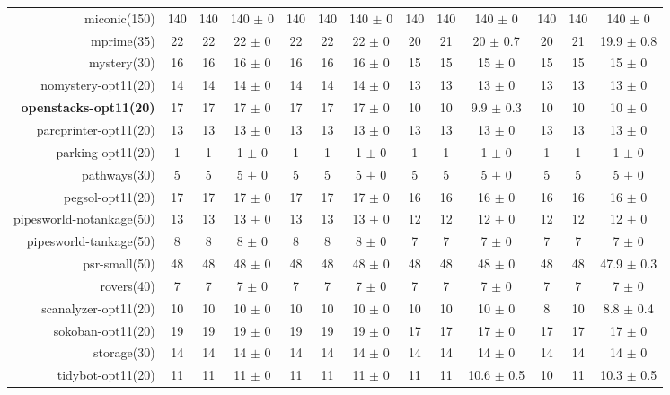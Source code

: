 \begin{center}
\begin{tabular}{|r|*{4}{ccc|}}
miconic(150) & 140 & 140 & 140 \(\pm\) 0 & 140 & 140 & 140 \(\pm\) 0 & 140 & 140 & 140 \(\pm\) 0 & 140 & 140 & 140 \(\pm\) 0\\
mprime(35) & 22 & 22 & 22 \(\pm\) 0 & 22 & 22 & 22 \(\pm\) 0 & 20 & 21 & 20 \(\pm\) 0.7 & 20 & 21 & 19.9 \(\pm\) 0.8\\
mystery(30) & 16 & 16 & 16 \(\pm\) 0 & 16 & 16 & 16 \(\pm\) 0 & 15 & 15 & 15 \(\pm\) 0 & 15 & 15 & 15 \(\pm\) 0\\
nomystery-opt11(20) & 14 & 14 & 14 \(\pm\) 0 & 14 & 14 & 14 \(\pm\) 0 & 13 & 13 & 13 \(\pm\) 0 & 13 & 13 & 13 \(\pm\) 0\\
\textbf{openstacks-opt11(20)} & 17 & 17 & 17 \(\pm\) 0 & 17 & 17 & 17 \(\pm\) 0 & 10 & 10 & 9.9 \(\pm\) 0.3 & 10 & 10 & 10 \(\pm\) 0\\
parcprinter-opt11(20) & 13 & 13 & 13 \(\pm\) 0 & 13 & 13 & 13 \(\pm\) 0 & 13 & 13 & 13 \(\pm\) 0 & 13 & 13 & 13 \(\pm\) 0\\
parking-opt11(20) & 1 & 1 & 1 \(\pm\) 0 & 1 & 1 & 1 \(\pm\) 0 & 1 & 1 & 1 \(\pm\) 0 & 1 & 1 & 1 \(\pm\) 0\\
pathways(30) & 5 & 5 & 5 \(\pm\) 0 & 5 & 5 & 5 \(\pm\) 0 & 5 & 5 & 5 \(\pm\) 0 & 5 & 5 & 5 \(\pm\) 0\\
pegsol-opt11(20) & 17 & 17 & 17 \(\pm\) 0 & 17 & 17 & 17 \(\pm\) 0 & 16 & 16 & 16 \(\pm\) 0 & 16 & 16 & 16 \(\pm\) 0\\
pipesworld-notankage(50) & 13 & 13 & 13 \(\pm\) 0 & 13 & 13 & 13 \(\pm\) 0 & 12 & 12 & 12 \(\pm\) 0 & 12 & 12 & 12 \(\pm\) 0\\
pipesworld-tankage(50) & 8 & 8 & 8 \(\pm\) 0 & 8 & 8 & 8 \(\pm\) 0 & 7 & 7 & 7 \(\pm\) 0 & 7 & 7 & 7 \(\pm\) 0\\
psr-small(50) & 48 & 48 & 48 \(\pm\) 0 & 48 & 48 & 48 \(\pm\) 0 & 48 & 48 & 48 \(\pm\) 0 & 48 & 48 & 47.9 \(\pm\) 0.3\\
rovers(40) & 7 & 7 & 7 \(\pm\) 0 & 7 & 7 & 7 \(\pm\) 0 & 7 & 7 & 7 \(\pm\) 0 & 7 & 7 & 7 \(\pm\) 0\\
scanalyzer-opt11(20) & 10 & 10 & 10 \(\pm\) 0 & 10 & 10 & 10 \(\pm\) 0 & 10 & 10 & 10 \(\pm\) 0 & 8 & 10 & 8.8 \(\pm\) 0.4\\
sokoban-opt11(20) & 19 & 19 & 19 \(\pm\) 0 & 19 & 19 & 19 \(\pm\) 0 & 17 & 17 & 17 \(\pm\) 0 & 17 & 17 & 17 \(\pm\) 0\\
storage(30) & 14 & 14 & 14 \(\pm\) 0 & 14 & 14 & 14 \(\pm\) 0 & 14 & 14 & 14 \(\pm\) 0 & 14 & 14 & 14 \(\pm\) 0\\
tidybot-opt11(20) & 11 & 11 & 11 \(\pm\) 0 & 11 & 11 & 11 \(\pm\) 0 & 11 & 11 & 10.6 \(\pm\) 0.5 & 10 & 11 & 10.3 \(\pm\) 0.5\\

\end{tabular}
\end{center}
